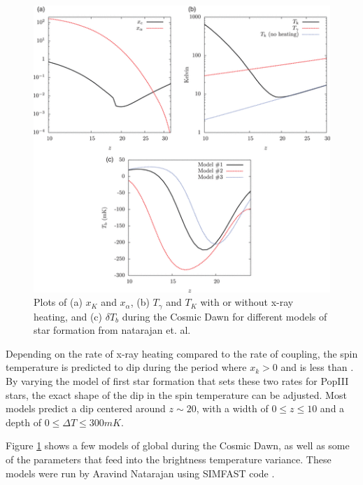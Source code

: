 \begin{figure}[htb]
\begin{center}
\includegraphics[width=0.95\linewidth]{Introduction/figures/ts_evolution.png}
\caption{Plots of (a) $x_K$ and $x_{\alpha}$, (b) $T_\gamma$ and $T_K$ with or without x-ray heating, and (c) $\delta T_b$ during the Cosmic Dawn for different models of star formation from natarajan et. al. \cite{natarajan_2014}}
\label{Fig:cd_global}
\end{center}
\end{figure}

Depending on the rate of x-ray heating compared to the rate of \lya coupling, the spin temperature is predicted to dip during the period where $x_k>0$ and \tk is less than \tg. By varying the model of first star formation that sets these two rates for PopIII stars, the exact shape of the dip in the spin temperature can be adjusted. Most models predict a dip centered around $z\sim20$, with a width of $0 \leq z \leq 10$ and a depth of $0\leq \Delta T \leq 300 mK$. 

Figure \ref{Fig:cd_global} shows a few models of global \dtb during the Cosmic Dawn, as well as some of the parameters that feed into the brightness temperature variance. These models were run by Aravind Natarajan using SIMFAST code \cite{simfast}\cite{21cmfast}\cite{natarajan_2014}.  

